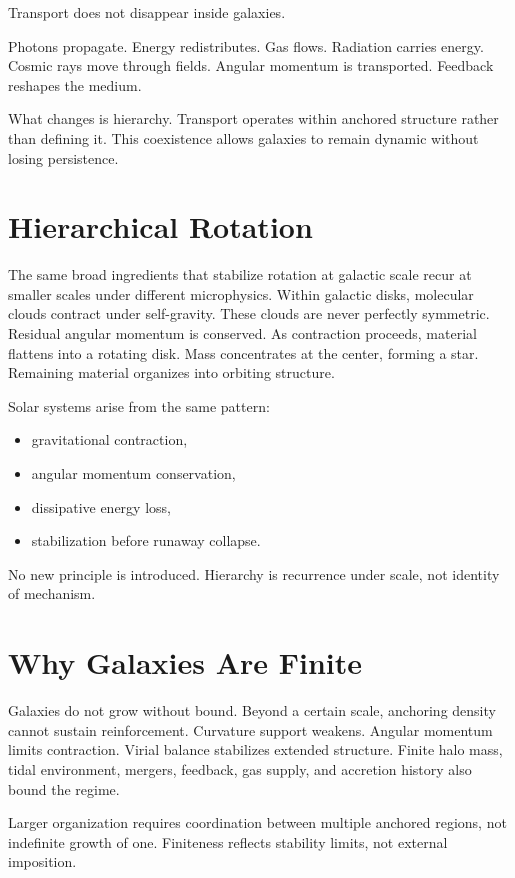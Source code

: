 \documentclass[11pt,twoside,openright]{book}
\begin{document}
Transport does not disappear inside galaxies.

Photons propagate. Energy redistributes. Gas flows. Radiation carries energy. Cosmic rays move through fields. Angular momentum is transported. Feedback reshapes the medium.

What changes is hierarchy. Transport operates within anchored structure rather than defining it. This coexistence allows galaxies to remain dynamic without losing persistence.

\section*{Hierarchical Rotation}

The same broad ingredients that stabilize rotation at galactic scale recur at smaller scales under different microphysics. Within galactic disks, molecular clouds contract under self-gravity. These clouds are never perfectly symmetric. Residual angular momentum is conserved. As contraction proceeds, material flattens into a rotating disk. Mass concentrates at the center, forming a star. Remaining material organizes into orbiting structure.

Solar systems arise from the same pattern:

\begin{itemize}
\item gravitational contraction,
\item angular momentum conservation,
\item dissipative energy loss,
\item stabilization before runaway collapse.
\end{itemize}

No new principle is introduced. Hierarchy is recurrence under scale, not identity of mechanism.

\section*{Why Galaxies Are Finite}

Galaxies do not grow without bound. Beyond a certain scale, anchoring density cannot sustain reinforcement. Curvature support weakens. Angular momentum limits contraction. Virial balance stabilizes extended structure. Finite halo mass, tidal environment, mergers, feedback, gas supply, and accretion history also bound the regime.

Larger organization requires coordination between multiple anchored regions, not indefinite growth of one. Finiteness reflects stability limits, not external imposition.
\end{document}
